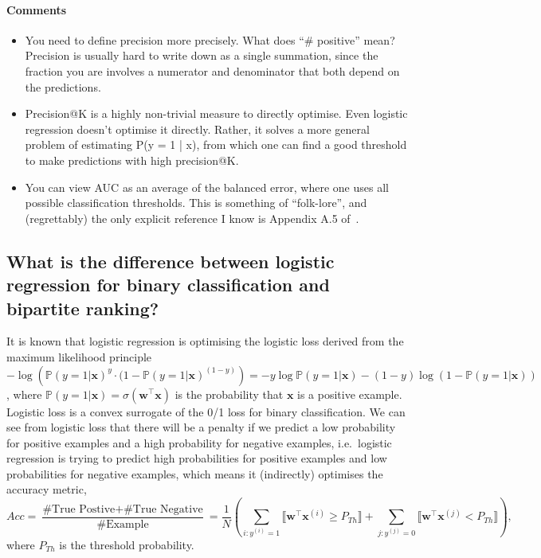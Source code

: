 \documentclass[9pt]{extarticle}
\newcommand{\llb}{\llbracket}
\newcommand{\rrb}{\rrbracket}
\newcommand{\x}{\mathbf{x}}
\newcommand{\1}{\mathbf{1}}
\newcommand{\w}{\mathbf{w}}
\newcommand{\p}{\mathbb{P}}
\newcommand{\pb}[1]{^{({#1})}}
\newcommand{\ie}{i.e.\ }
\begin{document}
\paragraph{Comments}
{\it
\begin{itemize}
\item You need to define precision more precisely. What does ``\# positive'' mean? Precision is usually hard to write down as a single summation, since the fraction you are involves a numerator and denominator that both depend on the predictions.
\item Precision@K is a highly non-trivial measure to directly optimise. Even logistic regression doesn't optimise it directly. Rather, it solves a more general problem of estimating P(y = 1 | x), from which one can find a good threshold to make predictions with high precision@K.
\item You can view AUC as an average of the balanced error, where one uses all possible classification thresholds. This is something of ``folk-lore'', and (regrettably) the only explicit reference I know is Appendix A.5 of~\cite{menon2015learning}.
\end{itemize}
}


\subsection*{What is the difference between logistic regression for binary classification and bipartite ranking?}

It is known that logistic regression is optimising the logistic loss derived from the maximum likelihood principle
$-\log \left( \p(y=1 |\x)^y \cdot (1 - \p(y=1 | \x)^{(1-y)} \right) = -y\log\p(y=1 | \x) - (1-y) \log(1-\p(y=1 | \x))$,
where $\p(y=1 | \x) = \sigma(\w^\top \x)$ is the probability that $\x$ is a positive example.
Logistic loss is a convex surrogate of the 0/1 loss for binary classification.
We can see from logistic loss that there will be a penalty if we predict a low probability for positive examples and 
a high probability for negative examples,
\ie logistic regression is trying to predict high probabilities for positive examples and low probabilities for negative examples,
which means it (indirectly) optimises the accuracy metric,
\begin{equation}
\label{eq:accuracy}
Acc = \frac{\text{\#True Postive} + \text{\#True Negative}}{\text{\#Example}} 
    = \frac{1}{N} \left( \sum_{i:y\pb{i}=1} \llb \w^\top \x\pb{i} \ge P_{Th} \rrb + \sum_{j:y\pb{j}=0} \llb \w^\top \x\pb{j} < P_{Th} \rrb \right),
\end{equation}
where $P_{Th}$ is the threshold probability.
\end{document}
